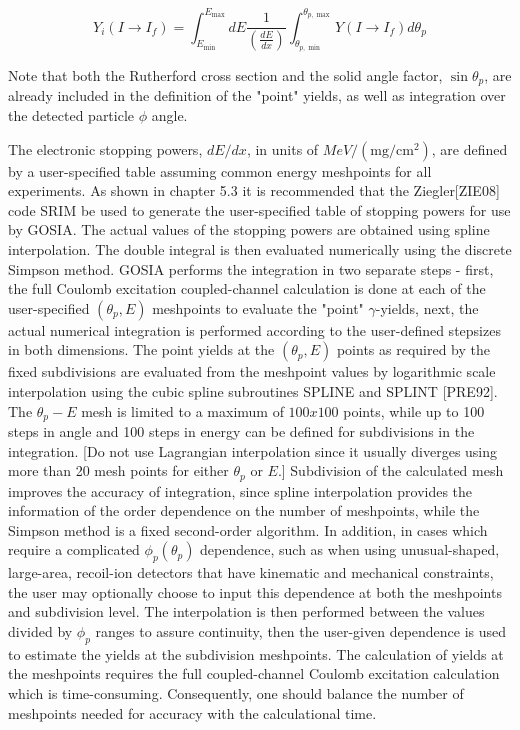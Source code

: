 \documentclass[10pt]{article}
\begin{document}
\begin{equation*}
Y_{i}\left(I \rightarrow I_{f}\right)=\int_{E_{\min }}^{E_{\max }} d E \frac{1}{\left(\frac{d E}{d x}\right)} \int_{\theta_{p, \min }}^{\theta_{p, \max }} Y\left(I \rightarrow I_{f}\right) d \theta_{p} \tag{6.44}
\end{equation*}


Note that both the Rutherford cross section and the solid angle factor, $\sin \theta_{p}$, are already included in the definition of the "point" yields, as well as integration over the detected particle $\phi$ angle.

The electronic stopping powers, $d E / d x$, in units of $M e V /\left(\mathrm{mg} / \mathrm{cm}^{2}\right)$, are defined by a user-specified table assuming common energy meshpoints for all experiments. As shown in chapter 5.3 it is recommended that the Ziegler[ZIE08] code SRIM be used to generate the user-specified table of stopping powers for use by GOSIA. The actual values of the stopping powers are obtained using spline interpolation. The double integral is then evaluated numerically using the discrete Simpson method. GOSIA performs the integration in two separate steps - first, the full Coulomb excitation coupled-channel calculation is done at each of the user-specified $\left(\theta_{p}, E\right)$ meshpoints to evaluate the "point" $\gamma$-yields, next, the actual numerical integration is performed according to the user-defined stepsizes in both dimensions. The point yields at the $\left(\theta_{p}, E\right)$ points as required by the fixed subdivisions are evaluated from the meshpoint values by logarithmic scale interpolation using the cubic spline subroutines SPLINE and SPLINT [PRE92]. The $\theta_{p}-E$ mesh is limited to a maximum of $100 x 100$ points, while up to 100 steps in angle and 100 steps in energy can be defined for subdivisions in the integration. [Do not use Lagrangian interpolation since it usually diverges using more than 20 mesh points for either $\theta_{p}$ or $E$.] Subdivision of the calculated mesh improves the accuracy of integration, since spline interpolation provides the information of the order dependence on the number of meshpoints, while the Simpson method is a fixed second-order algorithm. In addition, in cases which require a complicated $\phi_{p}\left(\theta_{p}\right)$ dependence, such as when using unusual-shaped, large-area, recoil-ion detectors that have kinematic and mechanical constraints, the user may optionally choose to input this dependence at both the meshpoints and subdivision level. The interpolation is then performed between the values divided by $\phi_{p}$ ranges to assure continuity, then the user-given dependence is used to estimate the yields at the subdivision meshpoints. The calculation of yields at the meshpoints requires the full coupled-channel Coulomb excitation calculation which is time-consuming. Consequently, one should balance the number of meshpoints needed for accuracy with the calculational time.
\end{document}
